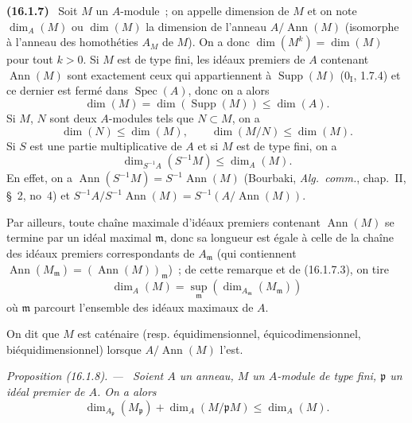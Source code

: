 \documentclass[10pt,oneside]{book}
\makeatletter
\newcommand{\setmanualcurrentlabel}[1]{\def\@currentlabel{#1}}
\newcommand{\oldpage}[2][]{%
  \setcounter{footnote}{0}%
  \marginpar{\scriptsize\textbf{#1}~|~#2}\ignorespaces}
\newenvironment{env}[1][]{\setmanualcurrentlabel{#1}\par\medskip\noindent\textbf{(#1)}\ }{\par}
\newenvironment{proposition}[1][]{%
  \setmanualcurrentlabel{#1}\par\medskip\noindent\itshape Proposition (#1). ---\ }{\par}
\makeatother
\begin{document}
\begin{env}[16.1.7]
\label{0.16.1.7-fr}
Soit $M$ un $A$-module~; on appelle dimension de $M$ et on note
$\dim_A(M)$ ou $\dim(M)$ la dimension de l'anneau $A/\operatorname{Ann}(M)$
(isomorphe à l'anneau des homothéties $A_M$ de $M$). On a donc
$\dim(M^k)=\dim(M)$ pour tout $k>0$. Si $M$ est de type fini, les idéaux
premiers de $A$ contenant $\operatorname{Ann}(M)$ sont exactement ceux qui
appartiennent à $\operatorname{Supp}(M)$ ($0_{\mathrm I}$, 1.7.4) et ce
dernier est fermé dans $\operatorname{Spec}(A)$, donc on a alors
\[
\label{0.16.1.7.1-fr}
  \dim(M)=\dim(\operatorname{Supp}(M))\leq\dim(A).
\tag{16.1.7.1}
\]
Si $M$, $N$ sont deux $A$-modules tels que $N\subset M$, on a
\[
\label{0.16.1.7.2-fr}
  \dim(N)\leq\dim(M),\qquad \dim(M/N)\leq\dim(M).
\tag{16.1.7.2}
\]
Si $S$ est une partie multiplicative de $A$ et si $M$ est de type fini, on a
\[
\label{0.16.1.7.3-fr}
  \dim_{S^{-1}A}(S^{-1}M)\leq\dim_A(M).
\tag{16.1.7.3}
\]
En effet, on a
$\operatorname{Ann}(S^{-1}M)=S^{-1}\operatorname{Ann}(M)$ (Bourbaki,
\emph{Alg.~comm.}, chap.~II, \S~2, no~4) et
$S^{-1}A/S^{-1}\operatorname{Ann}(M)=S^{-1}(A/\operatorname{Ann}(M))$.

Par ailleurs, toute chaîne maximale d'idéaux premiers contenant
$\operatorname{Ann}(M)$ se termine par un idéal maximal $\mathfrak{m}$, donc
sa longueur est égale à celle de la chaîne des idéaux premiers correspondants
de $A_{\mathfrak{m}}$ (qui contiennent
$\operatorname{Ann}(M_{\mathfrak{m}})=(\operatorname{Ann}(M))_{\mathfrak{m}}$)~;
de cette remarque et de (16.1.7.3), on tire
\[
\label{0.16.1.7.4-fr}
  \dim_A(M)=\sup_{\mathfrak{m}}
  (\dim_{A_{\mathfrak{m}}}(M_{\mathfrak{m}}))
\tag{16.1.7.4}
\]
où $\mathfrak{m}$ parcourt l'ensemble des idéaux maximaux de $A$.

On dit que $M$ est caténaire (resp. équidimensionnel, équicodimensionnel,
biéquidimensionnel) lorsque $A/\operatorname{Ann}(M)$ l'est.
\end{env}

\begin{proposition}[16.1.8]
\label{0.16.1.8-fr}
\oldpage[0\textsubscript{IV-1}]{25}
Soient $A$ un anneau, $M$ un $A$-module de type fini, $\mathfrak{p}$ un idéal
premier de $A$. On a alors
\[
\label{0.16.1.8.1-fr}
  \dim_{A_{\mathfrak{p}}}(M_{\mathfrak{p}})
  +\dim_A(M/\mathfrak{p}M)\leq\dim_A(M).
\tag{16.1.8.1}
\]
\end{proposition}
\end{document}
